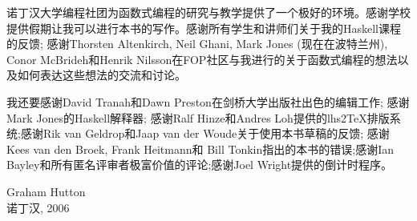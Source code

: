 诺丁汉大学编程社团为函数式编程的研究与教学提供了一个极好的环境。感谢学校提供假期让我可以进行本书的写作。感谢所有学生和讲师们关于我的Haskell课程的反馈;
感谢Thorsten Altenkirch, Neil Ghani, Mark Jones (现在在波特兰州), Conor McBrideh和Henrik Nilsson在FOP社区与我进行的关于函数式编程的想法以及如何表达这些想法的交流和讨论。

我还要感谢David Tranah和Dawn Preston在剑桥大学出版社出色的编辑工作; 感谢Mark
Jones的Haskell解释器; 感谢Ralf Hinze和Andres Loh提供的lhs2TeX排版系统;感谢Rik
van Geldrop和Jaap van der Woude关于使用本书草稿的反馈; 感谢Kees van den Broek,
Frank Heitmann和 Bill Tonkin指出的本书的错误;感谢Ian
Bayley和所有匿名评审者极富价值的评论;感谢Joel Wright提供的倒计时程序。

\begin{flushright}
Graham Hutton\\
诺丁汉, 2006
\end{flushright}
